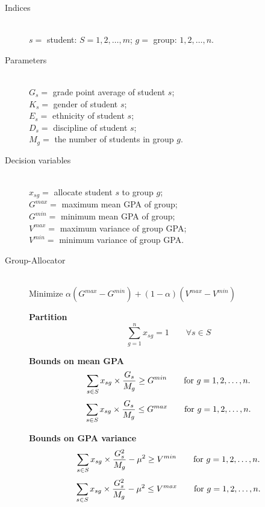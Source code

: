 \documentclass[12pt]{ORSNZ}
\begin{document}
\begin{description}
\item[Indices] \mbox{}\\
        $s =$ student: $S = 1, 2, \dots, m$;
        $g =$ group: $1, 2, \dots, n$.
\item[Parameters] \mbox{} \\
$G_s = $ grade point average of student $s$; \\
$K_s = $ gender of student $s$; \\
$E_s = $ ethnicity of student $s$; \\
$D_s = $ discipline of student $s$; \\
$M_g = $ the number of students in group $g$.


\item[Decision variables]\mbox{} \\
$x_{sg} = $ allocate student $s$ to group $g$;\\
$G^{max} = $ maximum mean GPA of group;\\
$G^{min} = $ minimum mean GPA of group;\\
$V^{max} = $ maximum variance of group GPA;\\
$V^{min} = $  minimum variance of group GPA.


\item[Group-Allocator]\mbox{} \\
Minimize $\alpha (G^{max} - G^{min}) + (1-\alpha)(V^{max} - V^{min})$

\textbf{Partition}
\begin{equation} \label{con1}
\sum_{g=1}^n x_{sg} =  1 \qquad \mbox{$\forall s \in S$}
\end{equation}

\textbf{Bounds on mean GPA}
\begin{equation} \label{con2}
\sum_{s \in S} x_{sg}\times \frac{G_s}{M_g} \geq G^{min} \qquad \mbox{for $ g = 1, 2, \ldots, n$.}
\end{equation}
\begin{equation} \label{con2}
\sum_{s \in S} x_{sg}\times \frac{G_s}{M_g} \leq G^{max} \qquad \mbox{for $ g = 1, 2, \ldots, n$.}
\end{equation}

\textbf{Bounds on GPA variance}
\begin{equation} \label{con2}
\sum_{s \in S} x_{sg}\times \frac{G_s^2}{M_g}  - \mu^2 \geq V^{min} \qquad \mbox{for $ g = 1, 2, \ldots, n$.}
\end{equation}
\begin{equation} \label{con2}
\sum_{s \in S} x_{sg}\times \frac{G_s^2}{M_g}  - \mu^2 \leq V^{max} \qquad \mbox{for $ g = 1, 2, \ldots, n$.}
\end{equation}



\end{description}
\end{document}

